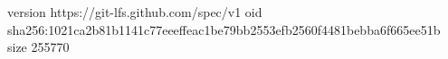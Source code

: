 version https://git-lfs.github.com/spec/v1
oid sha256:1021ca2b81b1141c77eeeffeac1be79bb2553efb2560f4481bebba6f665ee51b
size 255770
